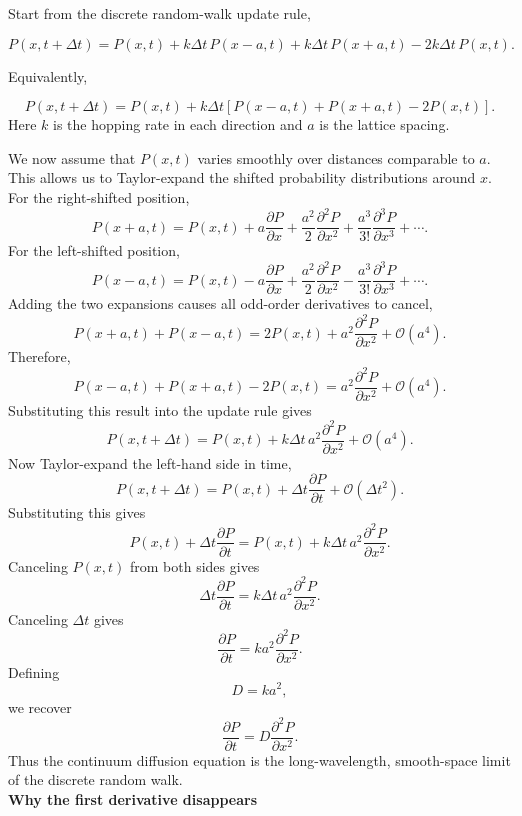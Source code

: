 Start from the discrete random-walk update rule,

\[ 
    P(x,t+\Delta t) = P(x,t) + k\Delta t\,P(x-a,t) + k\Delta t\,P(x+a,t) - 2k\Delta t\,P(x,t). 
\]

Equivalently,

\[ 
    P(x,t+\Delta t) = P(x,t) + k\Delta t\left[P(x-a,t)+P(x+a,t)-2P(x,t)\right]. 
\]
Here $k$ is the hopping rate in each direction and $a$ is the lattice spacing.

We now assume that $P(x,t)$ varies smoothly over distances comparable to $a$.
This allows us to Taylor-expand the shifted probability distributions around $x$.
For the right-shifted position,
\[ 
    P(x+a,t) = P(x,t) + a\frac{\partial P}{\partial x} + \frac{a^2}{2}\frac{\partial^2P}{\partial x^2} + \frac{a^3}{3!}\frac{\partial^3P}{\partial x^3} + \cdots. 
\]
For the left-shifted position,
\[ 
    P(x-a,t) = P(x,t) - a\frac{\partial P}{\partial x} + \frac{a^2}{2}\frac{\partial^2P}{\partial x^2} - \frac{a^3}{3!}\frac{\partial^3P}{\partial x^3} + \cdots. 
\]
% 
Adding the two expansions causes all odd-order derivatives to cancel,
% 
\[ 
    P(x+a,t)+P(x-a,t) = 2P(x,t) + a^2\frac{\partial^2P}{\partial x^2} + \mathcal{O}(a^4). 
\]
% 
Therefore,
% 
\[ 
    P(x-a,t)+P(x+a,t)-2P(x,t) = a^2\frac{\partial^2P}{\partial x^2} + \mathcal{O}(a^4). 
\]
% 
Substituting this result into the update rule gives
% 
\[ 
    P(x,t+\Delta t) = P(x,t) + k\Delta t\,a^2\frac{\partial^2P}{\partial x^2} + \mathcal{O}(a^4). 
\]
% 
Now Taylor-expand the left-hand side in time,
% 
\[ 
    P(x,t+\Delta t) = P(x,t) + \Delta t\frac{\partial P}{\partial t} + \mathcal{O}(\Delta t^2). 
    \]
% 
Substituting this gives
% 
\[ 
    P(x,t) + \Delta t\frac{\partial P}{\partial t} = P(x,t) + k\Delta t\,a^2\frac{\partial^2P}{\partial x^2}. 
\]
% 
Canceling $P(x,t)$ from both sides gives
% 
\[ 
    \Delta t\frac{\partial P}{\partial t} = k\Delta t\,a^2\frac{\partial^2P}{\partial x^2}. 
\]
% 
Canceling $\Delta t$ gives
% 
\[ 
    \frac{\partial P}{\partial t} = ka^2\frac{\partial^2P}{\partial x^2}. 
\]
% 
Defining
% 
\[ 
    \boxed{D=ka^2,} 
\]
% 
we recover
% 
\[ 
    \boxed{\frac{\partial P}{\partial t} = D\frac{\partial^2P}{\partial x^2}.} 
\]
% 
Thus the continuum diffusion equation is the long-wavelength, smooth-space limit of the discrete random walk.
% 
% 
\medskip
\\
\textbf{Why the first derivative disappears}

